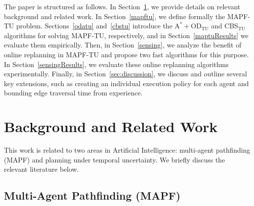 \documentclass[jair,twoside,11pt,theapa]{article}
\newcommand{\odatu}{$\mathrm{A^{*}+OD_{TU}}$\xspace}
\newcommand{\cbstu}{CBS$\mathrm{_{TU}}$\xspace}
\newcommand{\mapftu}{MAPF-TU\xspace}
\begin{document}


The paper is structured as follows. In Section~\ref{background}, we provide details on relevant background and related work. 
In Section~\ref{mapftu}, we define formally the \mapftu problem. 
Sections~\ref{odatu} and~\ref{cbstu} introduce the \odatu and \cbstu algorithms for solving \mapftu, respectively, 
and in Section~\ref{maptuResults} we evaluate them empirically. 
Then, in Section~\ref{sensing}, we analyze the benefit of online replanning in \mapftu and propose two fast algorithms for this purpose.  
In Section~\ref{sensingResults}, we evaluate these online replanning algorithms experimentally. 
Finally, in Section~\ref{sec:discussion}, we discuss and outline several key extensions, such as creating an individual execution policy for each agent and bounding edge traversal time from experience.

\section{Background and Related Work}
\label{background}

This work is related to two areas in Artificial Intelligence: multi-agent pathfinding (MAPF) and planning under temporal uncertainty. We briefly discuss the relevant literature below. 


\subsection{Multi-Agent Pathfinding (MAPF)}
\end{document}
